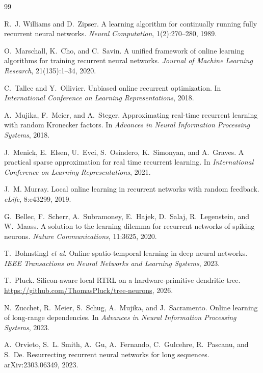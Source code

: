 \documentclass[11pt]{article}
\begin{document}
\begin{thebibliography}{99}

R.~J. Williams and D.~Zipser.
\newblock A learning algorithm for continually running fully recurrent neural networks.
\newblock \emph{Neural Computation}, 1(2):270--280, 1989.

O.~Marschall, K.~Cho, and C.~Savin.
\newblock A unified framework of online learning algorithms for training recurrent neural networks.
\newblock \emph{Journal of Machine Learning Research}, 21(135):1--34, 2020.

C.~Tallec and Y.~Ollivier.
\newblock Unbiased online recurrent optimization.
\newblock In \emph{International Conference on Learning Representations}, 2018.

A.~Mujika, F.~Meier, and A.~Steger.
\newblock Approximating real-time recurrent learning with random Kronecker factors.
\newblock In \emph{Advances in Neural Information Processing Systems}, 2018.

J.~Menick, E.~Elsen, U.~Evci, S.~Osindero, K.~Simonyan, and A.~Graves.
\newblock A practical sparse approximation for real time recurrent learning.
\newblock In \emph{International Conference on Learning Representations}, 2021.

J.~M. Murray.
\newblock Local online learning in recurrent networks with random feedback.
\newblock \emph{eLife}, 8:e43299, 2019.

G.~Bellec, F.~Scherr, A.~Subramoney, E.~Hajek, D.~Salaj, R.~Legenstein, and W.~Maass.
\newblock A solution to the learning dilemma for recurrent networks of spiking neurons.
\newblock \emph{Nature Communications}, 11:3625, 2020.

T.~Bohnstingl \emph{et al.}
\newblock Online spatio-temporal learning in deep neural networks.
\newblock \emph{IEEE Transactions on Neural Networks and Learning Systems}, 2023.

T.~Pluck.
\newblock Silicon-aware local RTRL on a hardware-primitive dendritic tree.
\newblock \url{https://github.com/ThomasPluck/tree-neurons}, 2026.

N.~Zucchet, R.~Meier, S.~Schug, A.~Mujika, and J.~Sacramento.
\newblock Online learning of long-range dependencies.
\newblock In \emph{Advances in Neural Information Processing Systems}, 2023.

A.~Orvieto, S.~L. Smith, A.~Gu, A.~Fernando, C.~Gulcehre, R.~Pascanu, and S.~De.
\newblock Resurrecting recurrent neural networks for long sequences.
\newblock arXiv:2303.06349, 2023.


\end{thebibliography}
\end{document}
